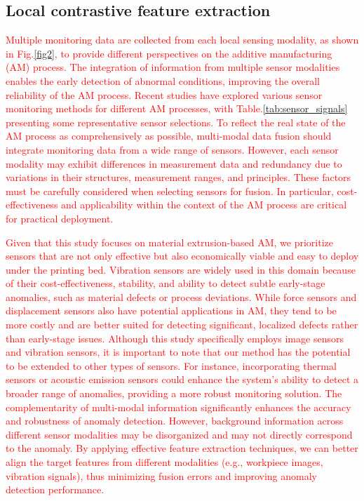 \documentclass[preprint,12pt]{elsarticle}
\begin{document}
\subsection{Local contrastive feature extraction}

\textcolor{red}{Multiple monitoring data are collected from each local sensing modality, as shown in Fig.\ref{fig2}, to provide different perspectives on the additive manufacturing (AM) process. The integration of information from multiple sensor modalities enables the early detection of abnormal conditions, improving the overall reliability of the AM process. Recent studies have explored various sensor monitoring methods for different AM processes, with Table.\ref{tab:sensor_signals} presenting some representative sensor selections. To reflect the real state of the AM process as comprehensively as possible, multi-modal data fusion should integrate monitoring data from a wide range of sensors. However, each sensor modality may exhibit differences in measurement data and redundancy due to variations in their structures, measurement ranges, and principles. These factors must be carefully considered when selecting sensors for fusion. In particular, cost-effectiveness and applicability within the context of the AM process are critical for practical deployment.}

\textcolor{red}{Given that this study focuses on material extrusion-based AM, we prioritize sensors that are not only effective but also economically viable and easy to deploy under the printing bed. Vibration sensors are widely used in this domain because of their cost-effectiveness, stability, and ability to detect subtle early-stage anomalies, such as material defects or process deviations. While force sensors and displacement sensors also have potential applications in AM, they tend to be more costly and are better suited for detecting significant, localized defects rather than early-stage issues. Although this study specifically employs image sensors and vibration sensors, it is important to note that our method has the potential to be extended to other types of sensors. For instance, incorporating thermal sensors or acoustic emission sensors could enhance the system's ability to detect a broader range of anomalies, providing a more robust monitoring solution. The complementarity of multi-modal information significantly enhances the accuracy and robustness of anomaly detection. However, background information across different sensor modalities may be disorganized and may not directly correspond to the anomaly. By applying effective feature extraction techniques, we can better align the target features from different modalities (e.g., workpiece images, vibration signals), thus minimizing fusion errors and improving anomaly detection performance.}
\end{document}
